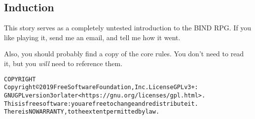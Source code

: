 
\subsection*{Induction}

This story serves as a completely untested introduction to the BIND RPG.
If you like playing it, send me an email, and tell me how it went.

Also, you should probably find a copy of the core rules.
You don't need to read it, but you \emph{will} need to reference them.

\begin{alltt}
COPYRIGHT
       Copyright \copyright 2019 Free Software Foundation, Inc.  License GPLv3+:
  GNU GPL version 3 or later <https://gnu.org/licenses/gpl.html>.
       This is free software: you are free to change and redistribute it.
  There is NO WARRANTY, to the extent permitted by law.

\end{alltt}
